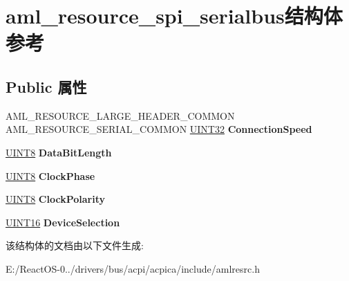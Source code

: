 \hypertarget{structaml__resource__spi__serialbus}{}\section{aml\+\_\+resource\+\_\+spi\+\_\+serialbus结构体 参考}
\label{structaml__resource__spi__serialbus}
\subsection*{Public 属性}
\begin{DoxyCompactItemize}
\item 
\mbox{\label{structaml__resource__spi__serialbus_a5a4d4a107dd638f1be7f63e861be0074}} 
A\+M\+L\+\_\+\+R\+E\+S\+O\+U\+R\+C\+E\+\_\+\+L\+A\+R\+G\+E\+\_\+\+H\+E\+A\+D\+E\+R\+\_\+\+C\+O\+M\+M\+ON A\+M\+L\+\_\+\+R\+E\+S\+O\+U\+R\+C\+E\+\_\+\+S\+E\+R\+I\+A\+L\+\_\+\+C\+O\+M\+M\+ON \hyperlink{_processor_bind_8h_ae1e6edbbc26d6fbc71a90190d0266018}{U\+I\+N\+T32} {\bfseries Connection\+Speed}
\item 
\mbox{\label{structaml__resource__spi__serialbus_a88b94af1699ac498ccc5fadfa2781bf3}} 
\hyperlink{_processor_bind_8h_ab27e9918b538ce9d8ca692479b375b6a}{U\+I\+N\+T8} {\bfseries Data\+Bit\+Length}
\item 
\mbox{\label{structaml__resource__spi__serialbus_abf7a17db4118b7bdddadf9b3ace40987}} 
\hyperlink{_processor_bind_8h_ab27e9918b538ce9d8ca692479b375b6a}{U\+I\+N\+T8} {\bfseries Clock\+Phase}
\item 
\mbox{\label{structaml__resource__spi__serialbus_a75f2e034c47c10ded3fe4b67e389d1b7}} 
\hyperlink{_processor_bind_8h_ab27e9918b538ce9d8ca692479b375b6a}{U\+I\+N\+T8} {\bfseries Clock\+Polarity}
\item 
\mbox{\label{structaml__resource__spi__serialbus_a80fe47070e04e9c16ac9e80921fb5909}} 
\hyperlink{_processor_bind_8h_a09f1a1fb2293e33483cc8d44aefb1eb1}{U\+I\+N\+T16} {\bfseries Device\+Selection}
\end{DoxyCompactItemize}


该结构体的文档由以下文件生成\+:\begin{DoxyCompactItemize}
\item 
E\+:/\+React\+O\+S-\/0../drivers/bus/acpi/acpica/include/amlresrc.\+h\end{DoxyCompactItemize}
